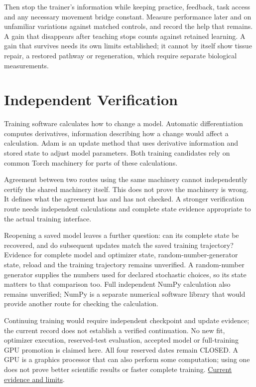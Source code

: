 Then stop the trainer's information while keeping practice, feedback, task access and any necessary movement bridge constant. Measure performance later and on unfamiliar variations against matched controls, and record the help that remains. A gain that disappears after teaching stops counts against retained learning. A gain that survives needs its own limits established; it cannot by itself show tissue repair, a restored pathway or regeneration, which require separate biological measurements.\par

\section{Independent Verification}

Training software calculates how to change a model. Automatic differentiation computes derivatives, information describing how a change would affect a calculation. Adam is an update method that uses derivative information and stored state to adjust model parameters. Both training candidates rely on common Torch machinery for parts of these calculations.\par

Agreement between two routes using the same machinery cannot independently certify the shared machinery itself. This does not prove the machinery is wrong. It defines what the agreement has and has not checked. A stronger verification route needs independent calculations and complete state evidence appropriate to the actual training interface.\par

Reopening a saved model leaves a further question: can its complete state be recovered, and do subsequent updates match the saved training trajectory? Evidence for complete model and optimizer state, random-number-generator state, reload and the training trajectory remains unverified. A random-number generator supplies the numbers used for declared stochastic choices, so its state matters to that comparison too. Full independent NumPy calculation also remains unverified; NumPy is a separate numerical software library that would provide another route for checking the calculation.\par

Continuing training would require independent checkpoint and update evidence; the current record does not establish a verified continuation. No new fit, optimizer execution, reserved-test evaluation, accepted model or full-training GPU promotion is claimed here. All four reserved dates remain CLOSED. A GPU is a graphics processor that can also perform some computation; using one does not prove better scientific results or faster complete training. \href{research-evidence.json}{Current evidence and limits}.\par

